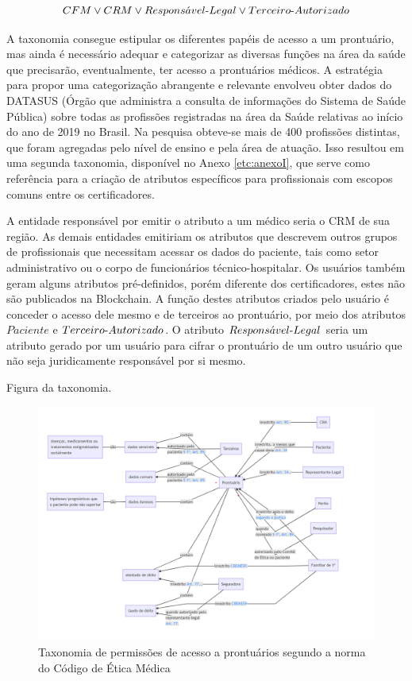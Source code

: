 \documentclass[a4paper,11pt]{article}
\begin{document}
\[ CFM \vee CRM \vee Respons\acute{a}vel\textnormal{-}Legal \vee Terceiro\textnormal{-}Autorizado \]

A taxonomia consegue estipular os diferentes papéis de acesso a um prontuário, mas ainda é necessário adequar e categorizar as diversas funções na área da saúde que precisarão, eventualmente, ter acesso a prontuários médicos.
A estratégia para propor uma categorização abrangente e relevante envolveu obter dados do DATASUS (Órgão que administra a consulta de informações do Sistema de Saúde Pública) sobre todas as profissões registradas na área da Saúde relativas ao início do ano de 2019 no Brasil.
Na pesquisa obteve-se mais de 400 profissões distintas, que foram agregadas pelo nível de ensino e pela área de atuação.
Isso resultou em uma segunda taxonomia, disponível no Anexo \ref{etc:anexoI}, que serve como referência para a criação de atributos específicos para profissionais com escopos comuns entre os certificadores.

A entidade responsável por emitir o atributo a um médico seria o CRM de sua região.
As demais entidades emitiriam os atributos que descrevem outros grupos de profissionais que necessitam acessar os dados do paciente, tais como setor administrativo ou o corpo de funcionários técnico-hospitalar.
Os usuários também geram alguns atributos pré-definidos, porém diferente dos certificadores, estes não são publicados na Blockchain.
A função destes atributos criados pelo usuário é conceder o acesso dele mesmo e de terceiros ao prontuário, por meio dos atributos $Paciente$ e $Terceiro\textnormal{-}Autorizado$.
O atributo $Respons\acute{a}vel\textnormal{-}Legal$ seria um atributo gerado por um usuário para cifrar o prontuário de um outro usuário que não seja juridicamente responsável por si mesmo.

{\color{ForestGreen}Figura da taxonomia}.

\begin{figure}[h]
  \centering
  \includegraphics[width=\textwidth]{images/taxonomia-de-permissoes.png}
  \caption{Taxonomia de permissões de acesso a prontuários segundo a norma do Código de Ética Médica}
  \label{fig:taxonomiaPermissoes}
\end{figure}
\end{document}
